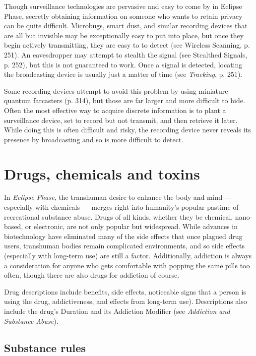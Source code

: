 Though surveillance technologies are pervasive and easy to come by in Eclipse Phase, secretly obtaining information on someone who wants to retain privacy can be quite difficult. Microbugs, smart dust, and similar recording devices that are all but invisible may be exceptionally easy to put into place, but once they begin actively transmitting, they are easy to to detect (see Wireless Scanning, p. 251). An eavesdropper may attempt to stealth the signal (see Stealthed Signals, p. 252), but this is not guaranteed to work. Once a signal is detected, locating the broadcasting device is usually just a matter of time (see \textit{Tracking}, p. 251). 

Some recording devices attempt to avoid this problem by using miniature quantum farcasters (p. 314), but those are far larger and more difficult to hide. Often the most effective way to acquire discrete information is to plant a surveillance device, set to record but not transmit, and then retrieve it later. While doing this is often difficult and risky, the recording device never reveals its presence by broadcasting and so is more difficult to detect. 

\section{Drugs, chemicals and toxins} \label{sec:drugs-chemicals-toxins} 

In \emph{Eclipse Phase}, the transhuman desire to enhance the body and mind --- especially with chemicals --- merges right into humanity’s popular pastime of recreational substance abuse. Drugs of all kinds, whether they be chemical, nano-based, or electronic, are not only popular but widespread. While advances in biotechnology have eliminated many of the side effects that once plagued drug users, transhuman bodies remain complicated environments, and so side effects (especially with long-term use) are still a factor. Additionally, addiction is always a consideration for anyone who gets comfortable with popping the same pills too often, though there are also drugs for addiction of course. 

Drug descriptions include benefits, side effects, noticeable signs that a person is using the drug, addictiveness, and effects from long-term use). Descriptions also include the drug’s Duration and its Addiction Modifier (see \emph{Addiction and Substance Abuse}). 

\subsection{Substance rules} \label{sec:substance-rules} 

